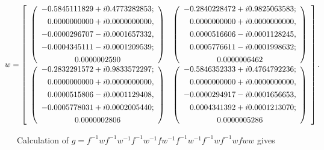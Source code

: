 \begin{small}
$$ 
\hskip-16pt
w = \left[\begin{array}{cc}
  \left(\begin{array}{c}
    -0.5845111829 + i 0.4773282853;\\[4pt]
   \phantom{-} 0.0000000000 + i 0.0000000000,\\[4pt]
   -0.0000296707 - i 0.0001657332,\\[4pt]
   -0.0004345111 - i 0.0001209539;\\[4pt]
    0.0000002590
  \end{array}\right)
 &
  \left(\begin{array}{c}
    -0.2840228472 + i 0.9825063583;\\[4pt]
  \phantom{-}  0.0000000000 + i 0.0000000000,\\[4pt]
  \phantom{-}  0.0000516606 - i 0.0001128245,\\[4pt]
   \phantom{-} 0.0005776611 - i 0.0001998632;\\[4pt]
    0.0000006462
  \end{array}\right)
 \\[12pt]
  \left(\begin{array}{c}
    -0.2832291572 + i 0.9833572297;\\[4pt]
   \phantom{-} 0.0000000000 + i 0.0000000000,\\[4pt]
   \phantom{-} 0.0000515806 - i 0.0001129408,\\[4pt]
    -0.0005778031 + i 0.0002005440;\\[4pt]
    0.0000002806
  \end{array}\right)
 &
  \left(\begin{array}{c}
    -0.5846352333 + i 0.4764792236;\\[4pt]
   \phantom{-} 0.0000000000 + i 0.0000000000,\\[4pt]
    -0.0000294917 - i 0.0001656653,\\[4pt]
   \phantom{-} 0.0004341392 + i 0.0001213070;\\[4pt]
    0.0000005286
  \end{array}\right)
\end{array}\right].$$
\end{small}
Calculation of
$g = f^{-1}wf^{-1}w^{-1}f^{-1}w^{-1}fw^{-1}f^{-1}w^{-1}f^{-1}wf^{-1}wfww$ gives
